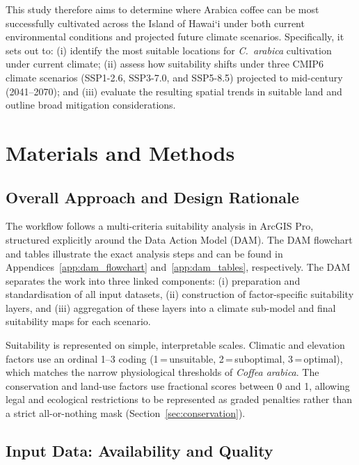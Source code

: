 \documentclass[12pt,a4paper]{article}
\newcommand{\okina}{\textquoteleft}
\begin{document}
This study therefore aims to determine where Arabica coffee can be most successfully cultivated across the Island of Hawai\okina i under both current environmental conditions and projected future climate scenarios. Specifically, it sets out to: (i) identify the most suitable locations for \textit{C.~arabica} cultivation under current climate; (ii) assess how suitability shifts under three CMIP6 climate scenarios (SSP1-2.6, SSP3-7.0, and SSP5-8.5) projected to mid-century (2041--2070); and (iii) evaluate the resulting spatial trends in suitable land and outline broad mitigation considerations.

\section{Materials and Methods}

\subsection{Overall Approach and Design Rationale}

The workflow follows a multi-criteria suitability analysis in ArcGIS Pro, structured explicitly around the Data Action Model (DAM). The DAM flowchart and tables illustrate the exact analysis steps and can be found in Appendices~\ref{app:dam_flowchart} and~\ref{app:dam_tables}, respectively. The DAM separates the work into three linked components: (i) preparation and standardisation of all input datasets, (ii) construction of factor-specific suitability layers, and (iii) aggregation of these layers into a climate sub-model and final suitability maps for each scenario.

Suitability is represented on simple, interpretable scales. Climatic and elevation factors use an ordinal 1--3 coding (1\,=\,unsuitable, 2\,=\,suboptimal, 3\,=\,optimal), which matches the narrow physiological thresholds of \textit{Coffea arabica}. The conservation and land-use factors use fractional scores between 0 and 1, allowing legal and ecological restrictions to be represented as graded penalties rather than a strict all-or-nothing mask (Section~\ref{sec:conservation}).

\subsection{Input Data: Availability and Quality}
\label{sec:data}
\end{document}
